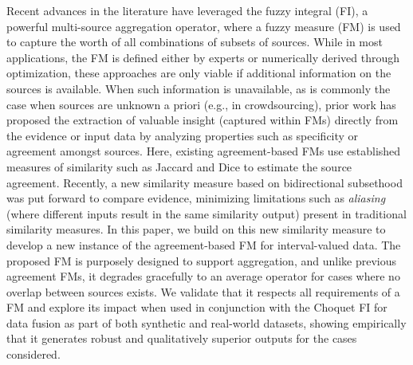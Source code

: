 
Recent advances in the literature have leveraged the fuzzy integral (FI), a powerful multi-source aggregation operator,  where a fuzzy measure (FM) is used to capture the worth of all combinations of subsets of sources. While in most applications, the FM is defined either by experts or numerically derived through optimization, these approaches are only viable if additional information on the sources is available. When such information is unavailable, as is commonly the case when sources are unknown a priori (e.g., in crowdsourcing), prior work has proposed the extraction of valuable insight (captured within FMs) directly from the evidence or input data by analyzing properties such as specificity or agreement amongst sources. Here, existing agreement-based FMs use established measures of similarity such as Jaccard and Dice to estimate the source agreement. Recently, a new similarity measure based on bidirectional subsethood was put forward to compare evidence, minimizing limitations such as \emph{aliasing} (where different inputs result in the same similarity output) present in traditional similarity measures. In this paper, we build on this new similarity measure to develop a new instance of the agreement-based FM for interval-valued data. The proposed FM is purposely designed to support aggregation, and unlike previous agreement FMs, it degrades gracefully to an average operator for cases where no overlap between sources exists. We validate that it respects all requirements of a FM and explore its impact when used in conjunction with the Choquet FI for data fusion as part of both synthetic and real-world datasets, showing empirically that it generates robust and qualitatively superior outputs for the cases considered.


